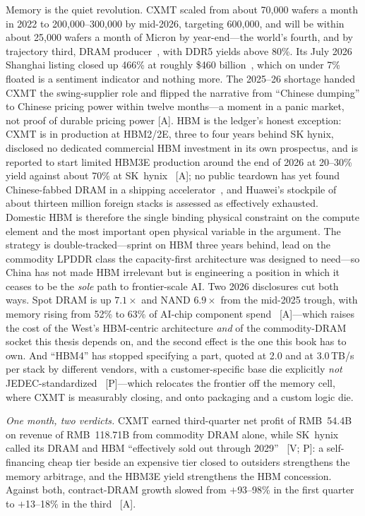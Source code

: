 Memory is the quiet revolution. CXMT scaled from about 70,000 wafers a month in 2022 to 200,000--300,000 by mid-2026, targeting 600,000, and will be within about 25,000 wafers a month of Micron by year-end---the world's fourth, and by trajectory third, DRAM producer~\cite{cxmt-capacity,citrini}, with DDR5 yields above 80\%. Its July 2026 Shanghai listing closed up 466\% at roughly \$460 billion~\cite{cxmt-ipo,cxmt-reuters}, which on under 7\% floated is a sentiment indicator and nothing more. The 2025--26 shortage handed CXMT the swing-supplier role and flipped the narrative from ``Chinese dumping'' to Chinese pricing power within twelve months---a moment in a panic market, not proof of durable pricing power [A]. HBM is the ledger's honest exception: CXMT is in production at HBM2/2E, three to four years behind SK hynix, disclosed no dedicated commercial HBM investment in its own prospectus, and is reported to start limited HBM3E production around the end of 2026 at 20--30\% yield against about 70\% at SK~hynix~\cite{hw-cxmt-hbm3e} [A]; no public teardown has yet found Chinese-fabbed DRAM in a shipping accelerator~\cite{hbm-teardown}, and Huawei's stockpile of about thirteen million foreign stacks is assessed as effectively exhausted. Domestic HBM is therefore the single binding physical constraint on the compute element and the most important open physical variable in the argument. The strategy is double-tracked---sprint on HBM three years behind, lead on the commodity LPDDR class the capacity-first architecture was designed to need---so China has not made HBM irrelevant but is engineering a position in which it ceases to be the \emph{sole} path to frontier-scale AI. Two 2026 disclosures cut both ways. Spot DRAM is up $7.1\times$ and NAND $6.9\times$ from the mid-2025 trough, with memory rising from 52\% to 63\% of AI-chip component spend~\cite{hc2026-memory-wall} [A]---which raises the cost of the West's HBM-centric architecture \emph{and} of the commodity-DRAM socket this thesis depends on, and the second effect is the one this book has to own. And ``HBM4'' has stopped specifying a part, quoted at 2.0 and at 3.0\,TB/s per stack by different vendors, with a customer-specific base die explicitly \emph{not} JEDEC-standardized~\cite{hc2026-hbm4-spread,hc2026-chbm} [P]---which relocates the frontier off the memory cell, where CXMT is measurably closing, and onto packaging and a custom logic die.

\emph{One month, two verdicts.} CXMT earned third-quarter net profit of RMB~54.4B on revenue of RMB~118.71B from commodity DRAM alone, while SK~hynix called its DRAM and HBM ``effectively sold out through 2029''~\cite{hw-cxmt-q3,hw-skhynix-q3} [V; P]: a self-financing cheap tier beside an expensive tier closed to outsiders strengthens the memory arbitrage, and the HBM3E yield strengthens the HBM concession. Against both, contract-DRAM growth slowed from $+$93--98\% in the first quarter to $+$13--18\% in the third~\cite{trendforce-dram} [A].

